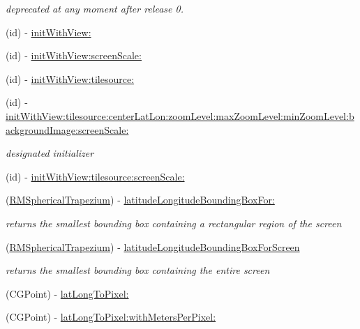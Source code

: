 \begin{DoxyCompactItemize}
\begin{DoxyCompactList}\small\item\em deprecated at any moment after release 0. \end{DoxyCompactList}\item 
(id) -\/ \hyperlink{interface_r_m_map_contents_ade383b6491bd769a6bb17f5d5b0c107e}{init\-With\-View\-:}
\item 
(id) -\/ \hyperlink{interface_r_m_map_contents_ade6f726a40417c75537812d02a0f9c6c}{init\-With\-View\-:screen\-Scale\-:}
\item 
(id) -\/ \hyperlink{interface_r_m_map_contents_a9c237b4599ba3e90db2ab34f40aab601}{init\-With\-View\-:tilesource\-:}
\item 
(id) -\/ \hyperlink{interface_r_m_map_contents_a6196963182efcdf037319e622f4ca2d8}{init\-With\-View\-:tilesource\-:center\-Lat\-Lon\-:zoom\-Level\-:max\-Zoom\-Level\-:min\-Zoom\-Level\-:background\-Image\-:screen\-Scale\-:}
\begin{DoxyCompactList}\small\item\em designated initializer \end{DoxyCompactList}\item 
(id) -\/ \hyperlink{interface_r_m_map_contents_ade69d06fda9b105ca86b023926e0bb21}{init\-With\-View\-:tilesource\-:screen\-Scale\-:}
\item 
(\hyperlink{struct_r_m_spherical_trapezium}{R\-M\-Spherical\-Trapezium}) -\/ \hyperlink{interface_r_m_map_contents_a9886560e7143a571c5be1260686dd7b6}{latitude\-Longitude\-Bounding\-Box\-For\-:}
\begin{DoxyCompactList}\small\item\em returns the smallest bounding box containing a rectangular region of the screen \end{DoxyCompactList}\item 
(\hyperlink{struct_r_m_spherical_trapezium}{R\-M\-Spherical\-Trapezium}) -\/ \hyperlink{interface_r_m_map_contents_a2f036b07434552724b6ad3d56f6e6ed6}{latitude\-Longitude\-Bounding\-Box\-For\-Screen}
\begin{DoxyCompactList}\small\item\em returns the smallest bounding box containing the entire screen \end{DoxyCompactList}\item 
(C\-G\-Point) -\/ \hyperlink{interface_r_m_map_contents_a80f4f3e3dcf962c4d1110248e5f83ff6}{lat\-Long\-To\-Pixel\-:}
\item 
(C\-G\-Point) -\/ \hyperlink{interface_r_m_map_contents_a6c7d5693a725d88769b5377d60cab941}{lat\-Long\-To\-Pixel\-:with\-Meters\-Per\-Pixel\-:}

\end{DoxyCompactItemize}
